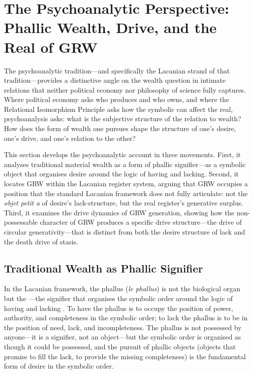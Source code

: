 \section{The Psychoanalytic Perspective: Phallic Wealth, Drive, and the Real of GRW}
\label{p15:sec:psychoanalysis}

\noindent
The psychoanalytic tradition---and specifically the Lacanian strand of that tradition---provides a distinctive angle on the wealth question in intimate relations that neither political economy nor philosophy of science fully captures. Where political economy asks who produces and who owns, and where the Relational Isomorphism Principle asks how the symbolic can affect the real, psychoanalysis asks: what is the subjective structure of the relation to wealth? How does the form of wealth one pursues shape the structure of one's desire, one's drive, and one's relation to the other?

This section develops the psychoanalytic account in three movements. First, it analyses traditional material wealth as a form of phallic signifier---as a symbolic object that organises desire around the logic of having and lacking. Second, it locates GRW within the Lacanian register system, arguing that GRW occupies a position that the standard Lacanian framework does not fully articulate: not the \emph{objet petit a} of desire's lack-structure, but the real register's generative surplus. Third, it examines the drive dynamics of GRW generation, showing how the non-possessable character of GRW produces a specific drive structure---the drive of circular generativity---that is distinct from both the desire structure of lack and the death drive of stasis.

\subsection{Traditional Wealth as Phallic Signifier}
\label{p15:subsec:phallic}

\noindent
In the Lacanian framework, the phallus (\emph{le phallus}) is not the biological organ but the ---the signifier that organises the symbolic order around the logic of having and lacking \parencite{lacan2006}. To have the phallus is to occupy the position of power, authority, and completeness in the symbolic order; to lack the phallus is to be in the position of need, lack, and incompleteness. The phallus is not possessed by anyone---it is a signifier, not an object---but the symbolic order is organised as though it could be possessed, and the pursuit of phallic objects (objects that promise to fill the lack, to provide the missing completeness) is the fundamental form of desire in the symbolic order.

